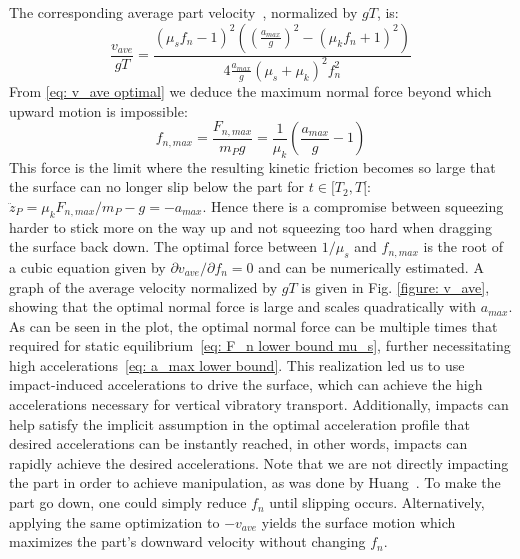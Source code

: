 The corresponding average part velocity~\cite{umbanhowar2008optimal}, normalized by $gT$, is:
%
\begin{equation}\label{eq: v_ave optimal}
    \frac{v_{ave}}{gT} = \frac{(\mu_s f_n -1)^2((\frac{a_{max}}{g})^2 - (\mu_k f_n + 1)^2)}{4\frac{a_{max}}{g}(\mu_s+\mu_k)^2f_n^2}
\end{equation}
%
From \eqref{eq: v_ave optimal} we deduce the maximum normal force beyond which upward motion is impossible:
%
\begin{equation}\label{eq: f_n,supp}
    f_{n,max} = \frac{F_{n,max}}{m_P g} = \frac{1}{\mu_k}\left(\frac{a_{max}}{g} - 1\right)
\end{equation}
%
This force is the limit where the resulting kinetic friction becomes so large that the surface can no longer slip below the part for $t \in [T_2, T[$: $\ddot{z}_P = \mu_k F_{n,max} / m_P - g = -a_{max}$. 
%
Hence there is a compromise between squeezing harder to stick more on the way up and not squeezing too hard when dragging the surface back down. 
%
The optimal force between $1/\mu_s$ and $f_{n,max}$ is the root of a cubic equation given by $\partial v_{ave} / \partial f_n = 0$ and can be numerically estimated.
%
A graph of the average velocity normalized by $gT$ is given in Fig. \ref{figure: v_ave}, showing that the optimal normal force is large and scales quadratically with $a_{max}$. 
%
As can be seen in the plot, the optimal normal force can be multiple times that required for static equilibrium~\eqref{eq: F_n lower bound mu_s}, further necessitating high accelerations~\eqref{eq: a_max lower bound}.
%
This realization led us to use impact-induced accelerations to drive the surface, which can achieve the high accelerations necessary for vertical vibratory transport.
%
Additionally, impacts can help satisfy the implicit assumption in the optimal acceleration profile that desired accelerations can be instantly reached, in other words, impacts can rapidly achieve the desired accelerations.
%
Note that we are not directly impacting the part in order to achieve manipulation, as was done by Huang~\cite{huang1997vibratory}.
%
To make the part go down, one could simply reduce $f_n$ until slipping occurs. Alternatively, applying the same optimization to $-v_{ave}$ yields the surface motion which maximizes the part's downward velocity without changing $f_n$.